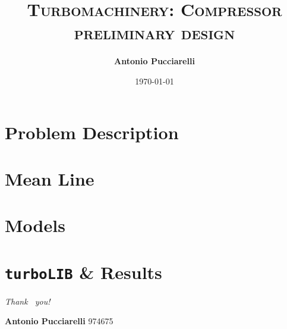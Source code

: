 \documentclass{beamer}
\author{\textbf{Antonio Pucciarelli}}
\title{\textsc{Turbomachinery: Compressor preliminary design}}
\institute{Politecnico di Milano}
\date{\today}
\begin{document}
	\begin{frame}
		\titlepage
    \end{frame}

	\section{Problem Description}
        
        
	\section{Mean Line}
        
    
   	\section{Models}
        
	
	\section{\texttt{turboLIB} \& Results}
		

	    
	\begin{frame}[allowframebreaks]
		\printbibliography
	\end{frame}

	\begin{frame}
		\begin{center}
			{\Huge \emph {\textrm{Thank  ~you!}}}
		\end{center}
		
		\vspace{2cm}
		
		\Large{\textbf{Antonio Pucciarelli} \hfill 974675} \\ 
        
	\end{frame}
\end{document}
